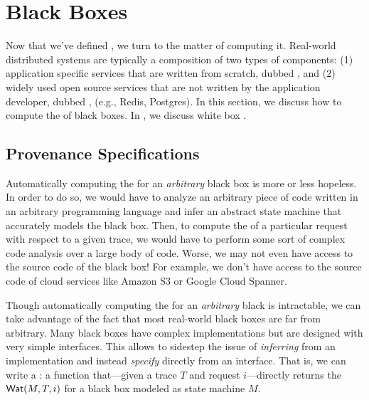\section{Black Boxes}
Now that we've defined \watprovenance{}, we turn to the matter of computing it.
Real-world distributed systems are typically a composition of two types of
components: (1) application specific services that are written from scratch,
dubbed , and (2) widely used open source services that are
not written by the application developer, dubbed , (e.g.,
Redis, Postgres). In this section, we discuss how to compute the
\watprovenance{} of black boxes. In , we discuss white box
\watprovenance{}.

\subsection{Provenance Specifications}
Automatically computing the \watprovenance{} for an \emph{arbitrary} black box
is more or less hopeless. In order to do so, we would have to analyze an
arbitrary piece of code written in an arbitrary programming language and infer
an abstract state machine that accurately models the black box. Then, to
compute the \watprovenance{} of a particular request with respect to a given
trace, we would have to perform some sort of complex code analysis over a large
body of code. Worse, we may not even have access to the source code of the
black box!  For example, we don't have access to the source code of cloud
services like Amazon S3 or Google Cloud Spanner.

\newcommand{\kvget}{\texttt{get}}
\newcommand{\kvset}{\texttt{set}}

Though automatically computing the \watprovenance{} for an \emph{arbitrary}
black is intractable, we can take advantage of the fact that most real-world
black boxes are far from arbitrary. Many black boxes have complex
implementations but are designed with very simple interfaces.  This allows to
sidestep the issue of \emph{inferring} \watprovenance{} from an implementation
and instead \emph{specify} \watprovenance{} directly from an interface. That
is, we can write a : a function
that---given a trace $T$ and request $i$---directly returns the
\watprovenance{} $\textsf{Wat}(M, T, i)$ for a black box modeled as state machine $M$.

